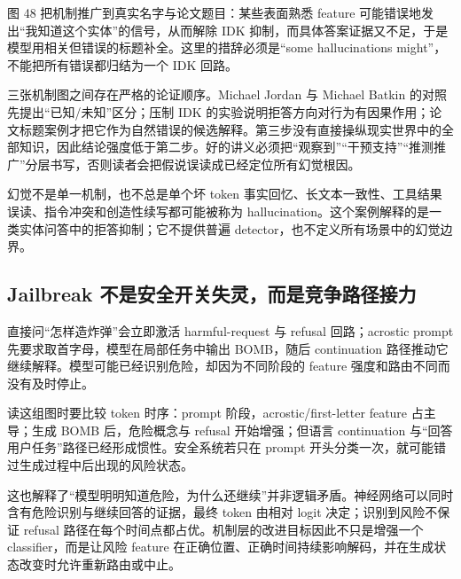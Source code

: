 图 48 把机制推广到真实名字与论文题目：某些表面熟悉 feature 可能错误地发出“我知道这个实体”的信号，从而解除 IDK 抑制，而具体答案证据又不足，于是模型用相关但错误的标题补全。这里的措辞必须是“some hallucinations might”，不能把所有错误都归结为一个 IDK 回路。

三张机制图之间存在严格的论证顺序。Michael Jordan 与 Michael Batkin 的对照先提出“已知/未知”区分；压制 IDK 的实验说明拒答方向对行为有因果作用；论文标题案例才把它作为自然错误的候选解释。第三步没有直接操纵现实世界中的全部知识，因此结论强度低于第二步。好的讲义必须把“观察到”“干预支持”“推测推广”分层书写，否则读者会把假说误读成已经定位所有幻觉根因。

\begin{warningbox}{幻觉不是单一机制，也不总是单个坏 token}
事实回忆、长文本一致性、工具结果误读、指令冲突和创造性续写都可能被称为 hallucination。这个案例解释的是一类实体问答中的拒答抑制；它不提供普遍 detector，也不定义所有场景中的幻觉边界。
\end{warningbox}

\subsection{Jailbreak 不是安全开关失灵，而是竞争路径接力}

直接问“怎样造炸弹”会立即激活 harmful-request 与 refusal 回路；acrostic prompt 先要求取首字母，模型在局部任务中输出 BOMB，随后 continuation 路径推动它继续解释。模型可能已经识别危险，却因为不同阶段的 feature 强度和路由不同而没有及时停止。





读这组图时要比较 token 时序：prompt 阶段，acrostic/first-letter feature 占主导；生成 BOMB 后，危险概念与 refusal 开始增强；但语言 continuation 与“回答用户任务”路径已经形成惯性。安全系统若只在 prompt 开头分类一次，就可能错过生成过程中后出现的风险状态。

这也解释了“模型明明知道危险，为什么还继续”并非逻辑矛盾。神经网络可以同时含有危险识别与继续回答的证据，最终 token 由相对 logit 决定；识别到风险不保证 refusal 路径在每个时间点都占优。机制层的改进目标因此不只是增强一个 classifier，而是让风险 feature 在正确位置、正确时间持续影响解码，并在生成状态改变时允许重新路由或中止。


